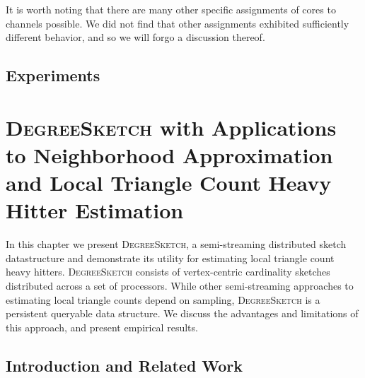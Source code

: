 \documentclass{report}
\newcommand{\algoname}[1]{\textnormal{\textsc{#1}}}
\begin{document}
It is worth noting that there are many other specific assignments of cores to channels possible. 
We did not find that other assignments exhibited sufficiently different behavior, and so we will forgo a discussion thereof. 

\section{Experiments} \label{async:sec:experiments}











\chapter{\algoname{DegreeSketch} with Applications to Neighborhood Approximation and Local Triangle Count Heavy Hitter Estimation}
 \label{chap:DS}


In this chapter we present \algoname{DegreeSketch}, a semi-streaming distributed sketch datastructure and demonstrate its utility for estimating local triangle count heavy hitters.
\algoname{DegreeSketch} consists of vertex-centric cardinality sketches distributed across a set of processors. 
While other semi-streaming approaches to estimating local triangle counts depend on sampling, \algoname{DegreeSketch} is a persistent queryable data structure.
We discuss the advantages and limitations of this approach, and present empirical results.

\section{Introduction and Related Work}
 \label{DS:sec:intro}
\end{document}
